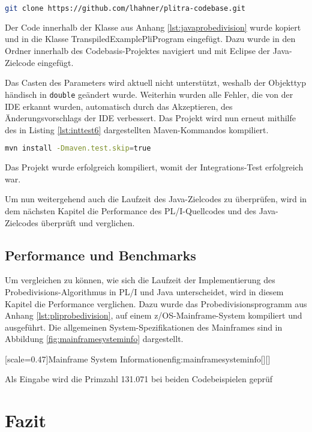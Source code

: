 \begin{lstlisting}[language=Bash, caption=Laden der Code-Basis, label={lst:inttest5}]
git clone https://github.com/lhahner/plitra-codebase.git
\end{lstlisting}

Der Code innerhalb der Klasse aus Anhang \ref{lst:javaprobedivision} wurde kopiert und in die Klasse TranspiledExamplePliProgram eingefügt. Dazu wurde in den Ordner  innerhalb des Codebasis-Projektes navigiert und mit Eclipse der Java-Zielcode eingefügt.

Das Casten des Parameters wird aktuell nicht unterstützt, weshalb der Objekttyp händisch
in \verb+double+ geändert wurde. Weiterhin wurden alle Fehler, die von der \ac{IDE} erkannt wurden, automatisch durch das Akzeptieren, des Änderungsvorschlags der  \ac{IDE}  verbessert.
Das Projekt wird nun erneut mithilfe des in Listing \ref{lst:inttest6} dargestellten Maven-Kommandos kompiliert.

\begin{lstlisting}[language=Bash, caption=Kompilieren des Projekts, label={lst:inttest6}]
mvn install -Dmaven.test.skip=true
\end{lstlisting}

Das Projekt wurde erfolgreich kompiliert, womit der Integrations-Test erfolgreich war.

Um nun weitergehend auch die Laufzeit des Java-Zielcodes zu überprüfen,
wird in dem nächsten Kapitel die Performance des PL/I-Quellcodes und des Java-Zielcodes überprüft und verglichen. 
\pagebreak

\subsection{Performance und Benchmarks}
Um vergleichen zu können, wie sich die Laufzeit der Implementierung des Probedivisions-Algorithmus in PL/I und Java unterscheidet, wird in diesem Kapitel die Performance verglichen. Dazu wurde das Probedivisionsprogramm aus Anhang \ref{lst:pliprobedivision}, auf einem z/OS-Mainframe-System kompiliert und ausgeführt. Die allgemeinen System-Spezifikationen des Mainframes sind in Abbildung \ref{fig:mainframesysteminfo} dargestellt.

[scale=0.47]{Mainframe System Informationen}{fig:mainframesysteminfo}[][]
\pagebreak

Als Eingabe wird die Primzahl 131.071 bei beiden Codebeispielen geprüf



\section{Fazit}

